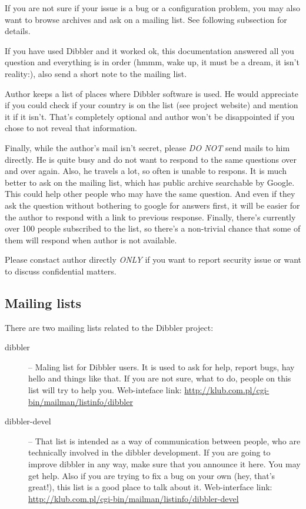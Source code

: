 If you are not sure if your issue is a bug or a configuration problem,
you may also want to browse archives and ask on a mailing list. See
following subsection for details.

If you have used Dibbler and it worked ok, this documentation answered
all you question and everything is in order (hmmm, wake up, it must be
a dream, it isn't reality:), also send a short note to the mailing
list.

Author keeps a list of places where Dibbler software is used. He would
appreciate if you could check if your country is on the list (see
project website) and mention it if it isn't. That's completely
optional and author won't be disappointed if you chose to not reveal
that information.

Finally, while the author's mail isn't secret, please \emph{DO NOT}
send mails to him directly. He is quite busy and do not want to
respond to the same questions over and over again. Also, he travels a
lot, so often is unable to respons. It is much better to ask on the
mailing list, which has public archive searchable by Google. This
could help other people who may have the same question. And even if
they ask the question without bothering to google for answers first,
it will be easier for the author to respond with a link to previous
response. Finally, there's currently over 100 people subscribed to the
list, so there's a non-trivial chance that some of them will respond
when author is not available.

Please constact author directly \emph{ONLY} if you want to report
security issue or want to discuss confidential matters.

\subsection{Mailing lists}
\label{mailing-list}
There are two mailing lists related to the Dibbler project:
\begin{description}
\item[dibbler] -- Maling list for Dibbler users. It is used to ask for help,
report bugs, hay hello and things like that. If you are not sure, what to
do, people on this list will try to help you. Web-inteface link:
\href{http://klub.com.pl/cgi-bin/mailman/listinfo/dibbler}{http://klub.com.pl/cgi-bin/mailman/listinfo/dibbler}
\item[dibbler-devel] -- That list is intended as a way of communication
between people, who are technically involved in the dibbler development.
If you are going to improve dibbler in any way, make sure that you announce
it here. You may get help. Also if you are trying to fix a bug on your own
(hey, that's great!), this list is a good place to talk about it.
Web-interface link: \href{http://klub.com.pl/cgi-bin/mailman/listinfo/dibbler-devel}{http://klub.com.pl/cgi-bin/mailman/listinfo/dibbler-devel}
\end{description}

